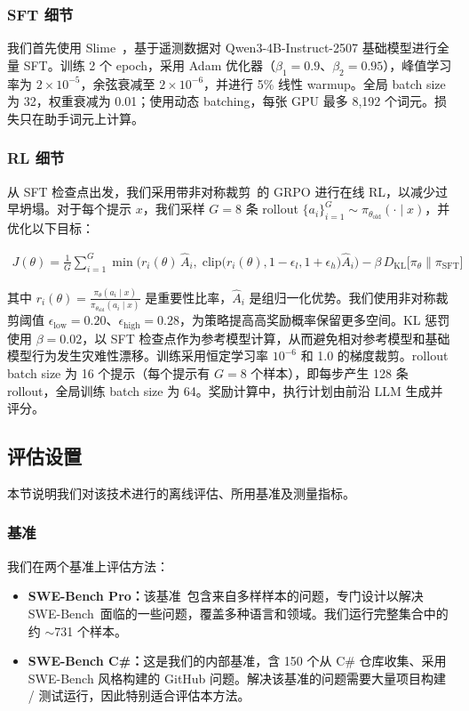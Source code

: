 \documentclass[sigconf,review]{acmart}
\begin{document}
\subsubsection{SFT 细节}
我们首先使用 Slime~\cite{slime}，基于遥测数据对 Qwen3-4B-Instruct-2507 基础模型进行全量 SFT。训练 2 个 epoch，采用 Adam 优化器（$\beta_1{=}0.9$、$\beta_2{=}0.95$），峰值学习率为 $2 \times 10^{-5}$，余弦衰减至 $2 \times 10^{-6}$，并进行 5\% 线性 warmup。全局 batch size 为 32，权重衰减为 0.01；使用动态 batching，每张 GPU 最多 8{,}192 个词元。损失只在助手词元上计算。

\subsubsection{RL 细节}
从 SFT 检查点出发，我们采用带非对称裁剪~\cite{dapo}的 GRPO 进行在线 RL，以减少过早坍塌。对于每个提示 $x$，我们采样 $G=8$ 条 rollout $\{a_i\}_{i=1}^{G} \sim \pi_{\theta_{\text{old}}}(\cdot \mid x)$，并优化以下目标：

{\fontsize{6.8pt}{10pt}\selectfont
\begin{equation}
\begin{split}
   J(\theta) = \frac{1}{G} \sum_{i=1}^{G}
   \min\!\Big(
     r_i(\theta)\,\hat{A}_i,\; \text{clip}\big(r_i(\theta),
       1{-}\epsilon_l,
       1{+}\epsilon_h\big)\hat{A}_i
   \Big) - \beta\, D_{\text{KL}}\!\big[\pi_\theta \| \pi_{\text{SFT}}\big]
   \end{split}
\end{equation}
}

\noindent 其中 $r_i(\theta)=\frac{\pi_\theta(a_i\mid x)}{\pi_{\theta_{\text{old}}}(a_i\mid x)}$ 是重要性比率，$\hat{A}_i$ 是组归一化优势。我们使用非对称裁剪阈值 $\epsilon_{\text{low}}=0.20$、$\epsilon_{\text{high}}=0.28$，为策略提高高奖励概率保留更多空间。KL 惩罚使用 $\beta=0.02$，以 SFT 检查点作为参考模型计算，从而避免相对参考模型和基础模型行为发生灾难性漂移。训练采用恒定学习率 $10^{-6}$ 和 1.0 的梯度裁剪。rollout batch size 为 16 个提示（每个提示有 $G{=}8$ 个样本），即每步产生 128 条 rollout，全局训练 batch size 为 64。奖励计算中，执行计划由前沿 LLM 生成并评分。

\subsection{评估设置}
本节说明我们对该技术进行的离线评估、所用基准及测量指标。

\subsubsection{基准}
我们在两个基准上评估方法：
\begin{itemize}
    \item \textbf{SWE-Bench Pro：}该基准~\cite{swepro}包含来自多样样本的问题，专门设计以解决 SWE-Bench~\cite{swebenchverified}面临的一些问题，覆盖多种语言和领域。我们运行完整集合中的约 $\sim$731 个样本。
    \item \textbf{SWE-Bench C\#：}这是我们的内部基准，含 150 个从 C\# 仓库收集、采用 SWE-Bench 风格构建的 GitHub 问题。解决该基准的问题需要大量项目构建 / 测试运行，因此特别适合评估本方法。
\end{itemize}
\end{document}
